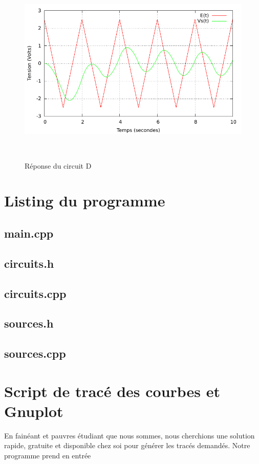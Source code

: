 \documentclass[a4paper,11pt]{article}
\begin{document}
\begin{figure}[h!]
\begin{minipage}[b]{0.5\linewidth}
   \end{minipage}
  \begin{minipage}[b]{0.5\linewidth}   
      \centering \includegraphics[scale=.68]{CDtriangle.pdf}
   \end{minipage}\\
 \caption{Réponse du circuit D}
\end{figure}




  \newpage
  \appendix
  \section{Listing du programme}
  \subsection{main.cpp}
    
    \newpage
  \subsection{circuits.h}
    
    \newpage
  \subsection{circuits.cpp}
    
    \newpage
   \subsection{sources.h}
    
    \newpage
   \subsection{sources.cpp}
    
    \newpage
  \section{Script de tracé des courbes et Gnuplot}
    En fainéant et pauvres étudiant que nous sommes, nous cherchions une solution rapide, gratuite et disponible chez soi pour générer les tracés 
demandés. Notre programme prend en entrée 
    
\end{document}
